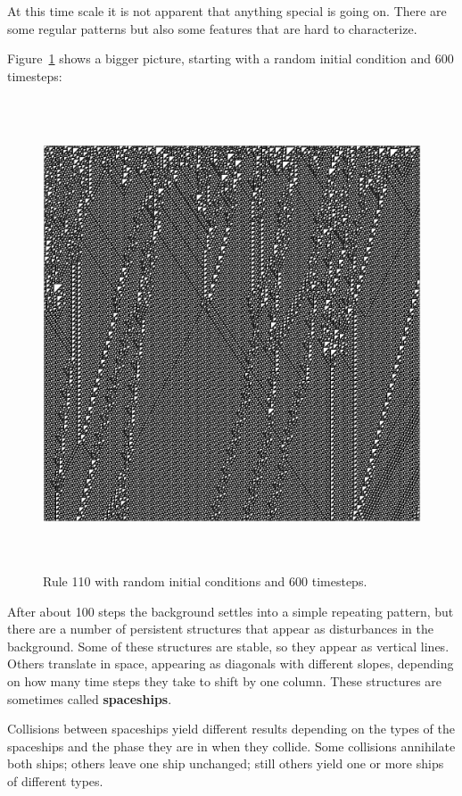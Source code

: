 \documentclass[10pt]{book}
\begin{document}
At this time scale it is not apparent that anything special is
going on.  There are some regular patterns but also some features
that are hard to characterize.

Figure~\ref{rule110} shows a bigger picture, starting with a random initial
condition and 600 timesteps:

\begin{figure}
\label{rule110}
\centerline{\includegraphics[width=5.5in,height=5.5in]{figs/rule110random.eps}}
\caption{Rule 110 with random initial conditions and 600 timesteps.}
\end{figure}

After about 100 steps the background settles into a simple repeating
pattern, but there are a number of persistent structures that appear
as disturbances in the background.  Some of these structures
are stable, so they appear as vertical lines.  Others translate in
space, appearing as diagonals with different slopes, depending on
how many time steps they take to shift by one column.  These
structures are sometimes called {\bf spaceships}.

Collisions between spaceships yield different results
depending on the types of the spaceships and the phase they are in
when they collide.  Some collisions annihilate both ships; others
leave one ship unchanged; still others yield one or more ships of
different types.
\end{document}
